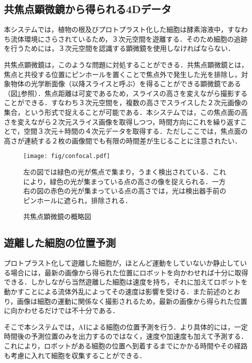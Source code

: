 \subsection{共焦点顕微鏡から得られる4Dデータ}
本システムでは，植物の根及びプロトプラスト化した細胞は酵素溶液中，すなわち流体環境にさらされているため，３次元空間を遊離する．そのため細胞の追跡を行うためには，３次元空間を認識する顕微鏡を使用しなければならない．
\par
共焦点顕微鏡は，このような問題に対処することができる．共焦点顕微鏡とは，焦点と共役する位置にピンホールを置くことで焦点外で発生した光を排除し，対象物体の光学断面像（以降スライスと呼ぶ）を得ることができる顕微鏡である（図\ref{fig:confocal}参照）．焦点距離は可変であるため，スライスの高さを変えながら撮影することができる．すなわち３次元空間を，複数の高さでスライスした２次元画像の集合，という形式で捉えることが可能である．本システムでは，この焦点面の高さを変えながら２次元スライス画像を取得しつつ，時間方向にこれを繰り返すことで，空間３次元＋時間の４次元データを取得する．ただしここでは，焦点面の高さが連続する２枚の画像間でも有限の時間差が生じることに注意されたい．

\begin{figure}[t]
    \centering
    \texttt{[image: fig/confocal.pdf]}
    \caption{共焦点顕微鏡の概略図}
    \small
    左の図では緑色の光が焦点で集まり，うまく検出されている．これにより，緑色の光が集まっている点の高さの像を捉えられる．一方右の図の赤色の光が集まっている点の高さでは，光は検出器手前のピンホールに遮られ，排除される．
    \label{fig:confocal}
\end{figure}

\subsection{遊離した細胞の位置予測}
プロトプラスト化して遊離した細胞が，ほとんど運動をしていないか静止している場合には，最新の画像から得られた位置にロボットを向かわせれば十分に取得できる．しかしながら当然遊離した細胞は速度を持ち，それに加えてロボットを動かすことによる流体外乱によってその速度は影響を受ける．また前述のとおり，画像は細胞の運動に関係なく撮影されるため，最新の画像から得られた位置に向かわせるだけでは不十分である．
\par
そこで本システムでは，AIによる細胞の位置予測を行う．より具体的には，一定時間後の予測位置のみを出力するのではなく，速度や加速度も加えて予測する．これにより，ロボットがある細胞の位置へ到着するまでにかかる時間やその経路も考慮に入れて細胞を収集することができる．

